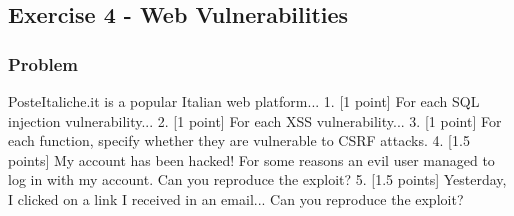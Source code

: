 \documentclass{article}
\begin{document}
\subsection{Exercise 4 - Web Vulnerabilities}
\subsubsection*{Problem}
PosteItaliche.it is a popular Italian web platform... 1. [1 point] For each SQL injection vulnerability... 2. [1 point] For each XSS vulnerability... 3. [1 point] For each function, specify whether they are vulnerable to CSRF attacks. 4. [1.5 points] My account has been hacked! For some reasons an evil user managed to log in with my account. Can you reproduce the exploit? 5. [1.5 points] Yesterday, I clicked on a link I received in an email... Can you reproduce the exploit?
\end{document}
